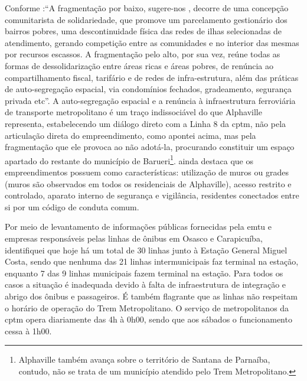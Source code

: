 	Conforme :``A fragmentação por baixo, sugere-nos , decorre de uma concepção comunitarista de solidariedade, que promove um parcelamento gestionário dos bairros pobres, uma descontinuidade física das redes de ilhas selecionadas de atendimento, gerando competição entre as comunidades e no interior das mesmas por recursos escassos. A fragmentação pelo alto, por sua vez, reúne todas as formas de dessolidarização entre áreas ricas e áreas pobres, de renúncia ao compartilhamento fiscal, tarifário e de redes de infra-estrutura, além das práticas de auto-segregação espacial, via condomínios fechados, gradeamento, segurança privada etc''. A auto-segregação espacial e a renúncia à infraestrutura ferroviária de transporte metropolitano é um traço indissociável do que Alphaville representa, estabelecendo um diálogo direto com a Linha 8 da \gls{cptm}, não pela articulação direta do empreendimento, como apontei acima, mas pela fragmentação que ele provoca ao não adotá-la, procurando constituir um espaço apartado do restante do município de Barueri\footnote{Alphaville também avança sobre o território de Santana de Parnaíba, contudo, não se trata de um município atendido pelo Trem Metropolitano.}.  ainda destaca que os empreendimentos possuem como características: utilização de muros ou grades (muros são observados em todos os residenciais de Alphaville), acesso restrito e controlado, aparato interno de segurança e vigilância, residentes conectados entre si por um código de conduta comum.

	Por meio de levantamento de informações públicas fornecidas pela \gls{emtu} e empresas responsáveis pelas linhas de ônibus em Osasco e Carapicuíba, identifiquei que hoje há um total de 30 linhas junto à Estação General Miguel Costa, sendo que nenhuma das 21 linhas intermunicipais faz terminal na estação, enquanto 7 das 9 linhas municipais fazem terminal na estação. Para todos os casos a situação é inadequada devido à falta de infraestrutura de integração e abrigo dos ônibus e passageiros. É também flagrante que as linhas não respeitam o horário de operação do Trem Metropolitano. O serviço de metropolitanos da \gls{cptm} opera diariamente das 4h à 0h00, sendo que aos sábados o funcionamento cessa à 1h00\cite{sitecptm3}.
	
